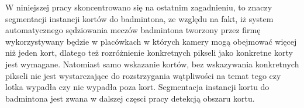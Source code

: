 W niniejszej pracy skoncentrowano się na ostatnim zagadnieniu,  to znaczy segmentacji instancji kortów do badmintona, ze względu na fakt, iż system automatycznego sędziowania meczów badmintona tworzony przez firmę \blue{} wykorzystywany będzie w placówkach w których kamery mogą obejmować więcej niż jeden kort, dlatego też rozróżnienie konkretnych pikseli jako konkretne korty jest wymagane. Natomiast samo wskazanie kortów, bez wskazywania konkretnych pikseli nie jest wystarczające do rozstrzygania wątpliwości na temat tego czy lotka wypadła czy nie wypadła poza kort. Segmentacja instancji kortu do badmintona jest zwana w dalszej częsci pracy detekcją obszaru kortu.
